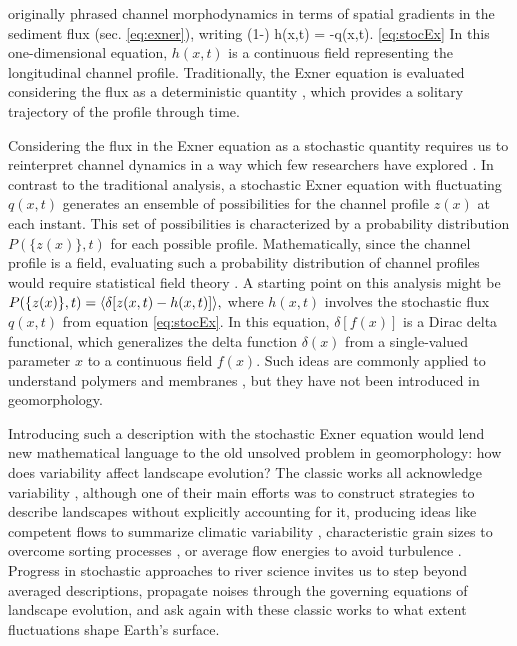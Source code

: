 \citet{Exner1925} originally phrased channel morphodynamics in terms of spatial gradients in the sediment flux (sec. \ref{eq:exner}), writing
\be (1-\phi) \pt h(x,t) = -\px q(x,t). \ref{eq:stocEx}\ee
In this one-dimensional equation, $h(x,t)$ is a continuous field representing the longitudinal channel profile.
Traditionally, the Exner equation is evaluated considering the flux as a deterministic quantity \citep{Parker2007,Viparelli2011,An2017}, which provides a solitary trajectory of the profile through time.

Considering the flux in the Exner equation as a stochastic quantity requires us to reinterpret channel dynamics in a way which few researchers have explored \citep{Jerolmack2005,Bohorquez2014}.
In contrast to the traditional analysis, a stochastic Exner equation with fluctuating $q(x,t)$ generates an ensemble of possibilities for the channel profile $z(x)$ at each instant. This set of possibilities is characterized by a probability distribution $P(\{z(x)\},t)$ for each possible profile.
Mathematically, since the channel profile is a field, evaluating such a probability distribution of channel profiles would require statistical field theory \citep{Kardar2007}.
A starting point on this analysis might be $P(\{z(x)\},t) = \langle \delta[z(x,t)-h(x,t)]\rangle,$ where $h(x,t)$ involves the stochastic flux $q(x,t)$ from equation \ref{eq:stocEx}.
In this equation, $\delta[f(x)]$ is a Dirac delta functional, which generalizes the delta function $\delta(x)$ from a single-valued parameter $x$ to a continuous field $f(x)$.
Such ideas are commonly applied to understand polymers and membranes \citep{Kawakatsu2004,Nelson2004}, but they have not been introduced in geomorphology.

Introducing such a description with the stochastic Exner equation would lend new mathematical language to the old unsolved problem in geomorphology: how does variability affect landscape evolution?
The classic works all acknowledge variability \citep{Leopold1952}, although one of their main efforts was to construct strategies to describe landscapes without explicitly accounting for it, producing ideas like competent flows to summarize climatic variability \citep{Wolman1960}, characteristic grain sizes to overcome sorting processes \citep{Parker1982}, or average flow energies to avoid turbulence \citep{Bagnold1954}.
Progress in stochastic approaches to river science \citep[e.g.][]{Furbish2021c,Ancey2020b} invites us to step beyond averaged descriptions, propagate noises through the governing equations of landscape evolution, and ask again with these classic works to what extent fluctuations shape Earth's surface.


